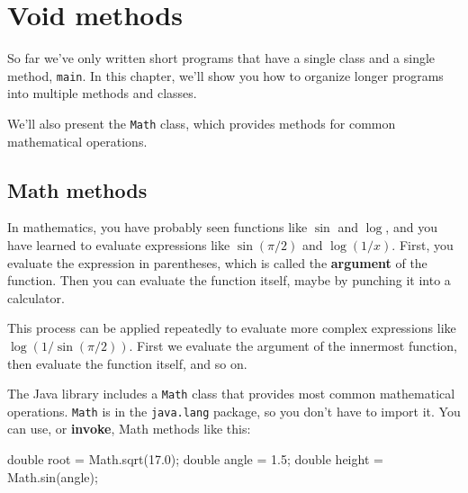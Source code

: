 \documentclass[12pt]{book}
\theoremstyle{exercise}
\newcommand{\java}[1]{\verb"#1"}
\begin{document}
\chapter{Void methods}
\label{voidmeth}

So far we've only written short programs that have a single class and a single method, \java{main}.
In this chapter, we'll show you how to organize longer programs into multiple methods and classes.

We'll also present the \java{Math} class, which provides methods for common mathematical operations.




\section{Math methods}


In mathematics, you have probably seen functions like $\sin$ and $\log$, and you have learned to evaluate expressions like $\sin(\pi/2)$ and $\log(1/x)$.
First, you evaluate the expression in parentheses, which is called the {\bf argument} of the function.
Then you can evaluate the function itself, maybe by punching it into a calculator.

This process can be applied repeatedly to evaluate more complex expressions like $\log(1/\sin(\pi/2))$.
First we evaluate the argument of the innermost function, then evaluate the function itself, and so on.


The Java library includes a \java{Math} class that provides most common mathematical operations.
\java{Math} is in the \java{java.lang} package, so you don't have to import it.
You can use, or {\bf invoke}, Math methods like this:

\begin{code}
    double root = Math.sqrt(17.0);
    double angle = 1.5;
    double height = Math.sin(angle);
\end{code}
\end{document}
